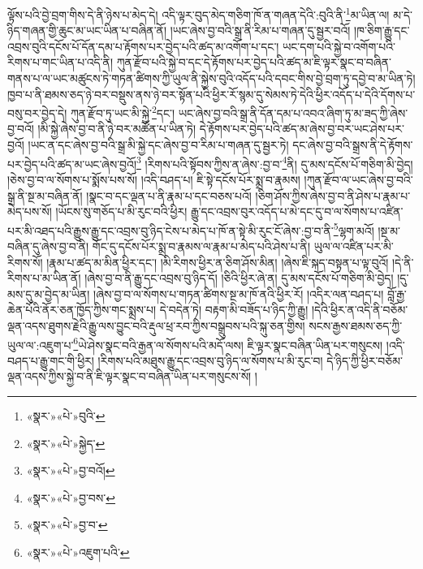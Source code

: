 ལྟོས་པའི་བྱེ་བྲག་གིས་དེ་ནི་ཉེས་པ་མེད་དེ། འདི་ལྟར་བུད་མེད་གཅིག་ཁོ་ན་གཞན་དེའི་:བུའི་ནི་\footnote{«སྣར་»«པེ་»བུའི་}མ་ཡིན་ལ། མ་དེ་ཉིད་གཞན་གྱི་ཆུང་མ་ཡང་ཡིན་པ་བཞིན་ནོ། །ཡང་ཞེས་བྱ་བའི་སྒྲ་ནི་རིམ་པ་གཞན་དུ་སྦྱར་བའོ། །ཁ་ཅིག་རྒྱུ་དང་འབྲས་བུའི་དངོས་པོ་དོན་དམ་པ་རྟོགས་པར་བྱེད་པའི་ཚད་མ་འགོག་པ་དང་། ཡང་དག་པའི་སྐྱེ་བ་འགོག་པའི་རིགས་པ་གང་ཡིན་པ་འདི་ནི། ཀུན་རྫོབ་པའི་སྐྱེ་བ་དང་དེ་རྟོགས་པར་བྱེད་པའི་ཚད་མ་ཇི་ལྟར་སྣང་བ་བཞིན་གནས་པ་ལ་ཡང་མཚུངས་ཏེ་གཏན་ཚིགས་ཀྱི་ཡུལ་ནི་སྐྱེས་བུའི་འདོད་པའི་དབང་གིས་བྱེ་བྲག་ཏུ་དབྱེ་བ་མ་ཡིན་ཏེ། ཁྱབ་པ་ནི་ཐམས་ཅད་ཉེ་བར་བསྡུས་ནས་ཉེ་བར་སྟོན་པའི་ཕྱིར་རོ་སྙམ་དུ་སེམས་ཏེ་དེའི་ཕྱིར་འདོད་པ་དེའི་དོགས་པ་བསུ་བར་བྱེད་དེ། ཀུན་རྫོབ་ཏུ་ཡང་མི་སྐྱེ་\footnote{«སྣར་»«པེ་»སྐྱེད་}དང་། ཡང་ཞེས་བྱ་བའི་སྒྲ་ནི་དོན་དམ་པ་འབའ་ཞིག་ཏུ་མ་ཟད་ཀྱི་ཞེས་བྱ་བའོ། །མི་སྐྱེ་ཞེས་བྱ་བ་ནི་ཉེ་བར་མཚོན་པ་ཡིན་ཏེ། དེ་རྟོགས་པར་བྱེད་པའི་ཚད་མ་ཞེས་བྱ་བར་ཡང་ཤེས་པར་བྱའོ། །ཡང་ན་དང་ཞེས་བྱ་བའི་སྒྲ་མི་སྐྱེ་དང་ཞེས་བྱ་བ་རིམ་པ་གཞན་དུ་སྦྱར་ཏེ། དང་ཞེས་བྱ་བའི་སྒྲས་ནི་དེ་རྟོགས་པར་བྱེད་པའི་ཚད་མ་ཡང་ཞེས་བྱའོ།\footnote{«སྣར་»«པེ་»བྱ་བའོ།} །རིགས་པའི་སྟོབས་ཀྱིས་ན་ཞེས་:བྱ་བ་\footnote{«སྣར་»«པེ་»བྱ་བས་}ནི། དུ་མས་དངོས་པོ་གཅིག་མི་བྱེད། །ཅེས་བྱ་བ་ལ་སོགས་པ་སྨོས་པས་སོ། །འདི་བཤད་པ། ཇི་སྟེ་དངོས་པོར་སྨྲ་བ་རྣམས། །ཀུན་རྫོབ་ལ་ཡང་ཞེས་བྱ་བའི་སྒྲ་ནི་སྔ་མ་བཞིན་ནོ། །སྣང་བ་དང་ལྡན་པ་ནི་རྣམ་པ་དང་བཅས་པའོ། །ཅིག་ཤོས་ཀྱིས་ཞེས་བྱ་བ་ནི་ཤེས་པ་རྣམ་པ་མེད་པས་སོ། །ཡོངས་སུ་གཅོད་པ་མི་རུང་བའི་ཕྱིར། རྒྱུ་དང་འབྲས་བུར་འདོད་པ་མེ་དང་དུ་བ་ལ་སོགས་པ་འཛིན་པར་མི་འཐད་པའི་རྒྱུས་རྒྱུ་དང་འབྲས་བུ་ཉིད་ངེས་པ་མེད་པ་ཁོ་ན་སྟེ་མི་རུང་ངོ་ཞེས་:བྱ་བ་ནི་\footnote{«སྣར་»«པེ་»བྱ་བ་}ལྷག་མའོ། །སྔ་མ་བཞིན་དུ་ཞེས་བྱ་བ་ནི། གོང་དུ་དངོས་པོར་སྨྲ་བ་རྣམས་ལ་རྣམ་པ་མེད་པའི་ཤེས་པ་ནི། ཡུལ་ལ་འཛིན་པར་མི་རིགས་སོ། །རྣམ་པ་ཚད་མ་མིན་ཕྱིར་དང་། །མི་རིགས་ཕྱིར་ན་ཅིག་ཤོས་མིན། །ཞེས་ཇི་སྐད་བསྟན་པ་ལྟ་བུའོ། །དེ་ནི་རིགས་པ་མ་ཡིན་ནོ། །ཞེས་བྱ་བ་ནི་རྒྱུ་དང་འབྲས་བུ་ཉིད་དོ། །ཅིའི་ཕྱིར་ཞེ་ན། དུ་མས་དངོས་པོ་གཅིག་མི་བྱེད། །དུ་མས་དུ་མ་བྱེད་མ་ཡིན། །ཞེས་བྱ་བ་ལ་སོགས་པ་གཏན་ཚིགས་སྔ་མ་ཁོ་ནའི་ཕྱིར་རོ། །འདིར་ལན་བཤད་པ། བློ་རྒྱ་ཆེན་པོའི་ནོར་ཅན་ཁྱོད་ཀྱིས་གང་སྨྲས་པ། དེ་བདེན་ཏེ། བརྟག་མི་བཟོད་པ་ཉིད་ཀྱི་རྒྱུ། །དེའི་ཕྱིར་ན་འདི་ནི་བཅོམ་ལྡན་འདས་ཐུགས་རྗེའི་རྒྱུ་ལས་བྱུང་བའི་རྡུལ་ཕྲ་རབ་ཀྱིས་བསྒྲུབས་པའི་སྐུ་ཅན་གྱིས། སངས་རྒྱས་ཐམས་ཅད་ཀྱི་ཡུལ་ལ་:འཇུག་པ་\footnote{«སྣར་»«པེ་»འཇུག་པའི་}ཡེ་ཤེས་སྣང་བའི་རྒྱན་ལ་སོགས་པའི་མདོ་ལས། ཇི་ལྟར་སྣང་བཞིན་ཡིན་པར་གསུངས། །འདི་བཤད་པ་རྒྱུ་གང་གི་ཕྱིར། །རིགས་པའི་མཐུས་རྒྱུ་དང་འབྲས་བུ་ཉིད་ལ་སོགས་པ་མི་རུང་བ། དེ་ཉིད་ཀྱི་ཕྱིར་བཅོམ་ལྡན་འདས་ཀྱིས་སྐྱེ་བ་ནི་ཇི་ལྟར་སྣང་བ་བཞིན་ཡིན་པར་གསུངས་སོ། །
